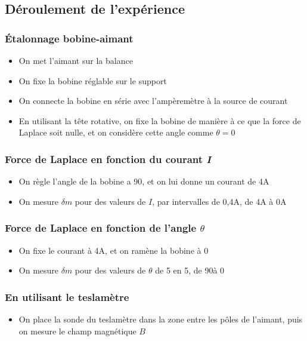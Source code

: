 \documentclass[12pt,a4paper]{article}
\begin{document}
    \subsection{Déroulement de l'expérience}
    \subsubsection{Étalonnage bobine-aimant}
    \begin{itemize}
        \item On met l'aimant sur la balance
        \item On fixe la bobine réglable sur le support
        \item On connecte la bobine en série avec l'ampèremètre à la source de courant
        \item En utilisant la tête rotative, on fixe la bobine de manière à ce que la force de Laplace soit nulle, et on considère cette angle comme $\theta = 0$\textdegree
    \end{itemize}
    \subsubsection{Force de Laplace en fonction du courant \textit{I}}
    \begin{itemize}
        \item On règle l'angle de la bobine a 90\textdegree, et on lui donne un courant de 4A
        \item On mesure $\delta m$ pour des valeurs de $I$, par intervalles de 0,4A, de 4A à 0A
    \end{itemize}
    \subsubsection{Force de Laplace en fonction de l'angle \texorpdfstring{$\theta$}{theta}}
    \begin{itemize}
        \item On fixe le courant à 4A, et on ramène la bobine à 0\textdegree
        \item On mesure $\delta m$ pour des valeurs de $\theta$ de 5 en 5, de 90\textdegree à 0\textdegree
    \end{itemize}
    \subsubsection{En utilisant le teslamètre}
    \begin{itemize}
        \item On place la sonde du teslamètre dans la zone entre les pôles de l'aimant, puis on mesure le champ magnétique $B$
    \end{itemize}
\end{document}
